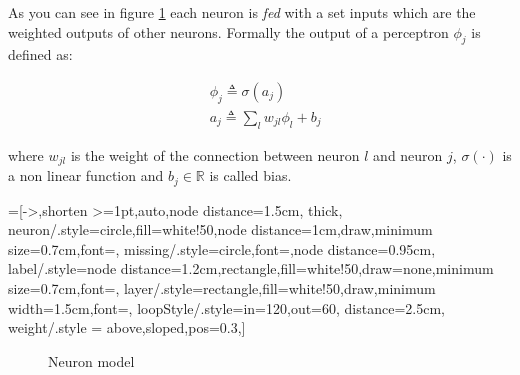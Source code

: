 As you can see in figure \ref{neuron_model} each neuron is \textit{fed} with a set inputs which are the weighted outputs of other neurons. Formally the output of a perceptron $\phi_j$
is defined as:
 
\begin{align}
&\phi_j \triangleq \sigma(a_j)\\
&a_j \triangleq \sum_l w_{jl}\phi_l +b_j
\end{align}

where $w_{jl}$ is the weight of the connection between neuron $l$ and neuron $j$, $\sigma(\cdot)$ is a non linear function and $b_j \in \mathbb{R}$ is called bias.


=[->,shorten >=1pt,auto,node distance=1.5cm,
  thick,
  neuron/.style={circle,fill=white!50,node distance=1cm,draw,minimum size=0.7cm,font=\sffamily\normalsize},
  missing/.style={circle,font=\sffamily\Large,node distance=0.95cm},
  label/.style={node distance=1.2cm,rectangle,fill=white!50,draw=none,minimum size=0.7cm,font=\sffamily\normalsize},
  layer/.style={rectangle,fill=white!50,draw,minimum width=1.5cm,font=\sffamily\Large},
  loopStyle/.style={in=120,out=60, distance=2.5cm},
  weight/.style = {above,sloped,pos=0.3},]
\begin{figure}
 \centering
{}
\caption{Neuron model}
\label{neuron_model}
\end{figure}


